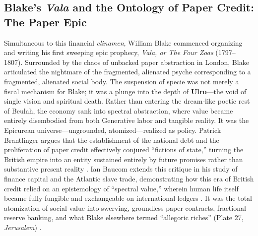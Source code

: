 \documentclass[
]{article}
\begin{document}
\subsection{\texorpdfstring{Blake's \emph{Vala} and the Ontology of
Paper Credit: The Paper
Epic}{Blake's Vala and the Ontology of Paper Credit: The Paper Epic}}\label{blakes-vala-and-the-ontology-of-paper-credit-the-paper-epic}

Simultaneous to this financial \emph{clinamen}, William Blake commenced
organizing and writing his first sweeping epic prophecy, \emph{Vala, or
The Four Zoas} (1797--1807). Surrounded by the chaos of unbacked paper
abstraction in London, Blake articulated the nightmare of the
fragmented, alienated psyche corresponding to a fragmented, alienated
social body. The suspension of specie was not merely a fiscal mechanism
for Blake; it was a plunge into the depth of \textbf{Ulro}---the void of
single vision and spiritual death. Rather than entering the dream-like
poetic rest of Beulah, the economy sank into spectral abstraction, where
value became entirely disembodied from both Generative labor and
tangible reality. It was the Epicurean universe---ungrounded,
atomized---realized as policy. Patrick Brantlinger argues that the
establishment of the national debt and the proliferation of paper credit
effectively conjured ``fictions of state,'' turning the British empire
into an entity sustained entirely by future promises rather than
substantive present reality
\citep{brantlinger1996fictions, tooke1838history}. Ian Baucom extends
this critique in his study of finance capital and the Atlantic slave
trade, demonstrating how this era of British credit relied on an
epistemology of ``spectral value,'' wherein human life itself became
fully fungible and exchangeable on international ledgers
\citep{baucom2005specters}. It was the total atomization of social value
into swerving, groundless paper contracts, fractional reserve banking,
and what Blake elsewhere termed ``allegoric riches'' (Plate 27,
\emph{Jerusalem}) \citep{makdisi2003william, erdman1988complete}.
\end{document}
